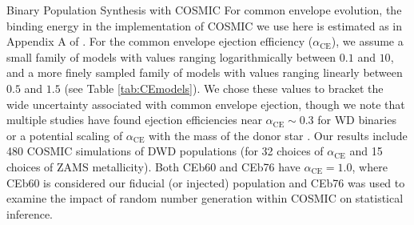 \documentclass[twocolumn]{aastex631}
\newcommand*{\alphaCE}{\alpha_{\mathrm{CE}}}
\begin{document}
\begin{subsection}{Binary Population Synthesis with COSMIC}
For common envelope evolution,
    the binding energy 
    in the implementation of COSMIC we use here
    is estimated as in Appendix A of \citet{Claeys2014}.
For the common envelope ejection efficiency ($\alphaCE$),
    we assume a small family of models with values ranging 
    logarithmically between $0.1$ and $10$, 
    and a more finely sampled family of models with values
    ranging linearly between $0.5$ and $1.5$
    (see Table \ref{tab:CEmodels}). 
We chose these values to bracket the wide uncertainty associated with
    common envelope ejection, though we note that multiple studies have found
    ejection efficiencies near $\alphaCE\sim0.3$ for WD binaries \citep[e.g.][]{Zorotovic2010,Scherbak2023} 
    or a potential scaling of $\alphaCE$ with the mass of the donor star \citep[e.g.][]{DeMarco2011}.
Our results include 480 COSMIC simulations of DWD populations
    (for 32 choices of $\alphaCE{}$ and 15 choices of ZAMS metallicity).
Both CEb60 and CEb76 have $\alphaCE{} = 1.0$,
    where CEb60 is considered our fiducial (or injected) population
    and CEb76 was used to examine the impact of random number generation
    within COSMIC on statistical inference.

\end{subsection}
\end{document}
